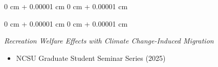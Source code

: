 \documentclass[12pt]{article}
\newenvironment{highlights}{
	\begin{itemize}[
		topsep=0.10 cm,
		parsep=0.10 cm,
		partopsep=0pt,
		itemsep=0pt,
		leftmargin=0.3 cm + 10pt,
		label={}
		]
	}{
	\end{itemize}
} %
\newenvironment{onecolentry}{
	\begin{adjustwidth}{
			0 cm + 0.00001 cm
		}{
			0 cm + 0.00001 cm
		}
	}
	{
	\end{adjustwidth}
} %
\newenvironment{paper}{
	\begin{onecolentry}
	\begin{hangingpar}
}{
	\end{hangingpar}
	\end{onecolentry}
	\smallskip
} %
\newenvironment{twocolentry}[2][]{
	\onecolentry
	\def\secondColumn{#2}
	\setcolumnwidth{\fill, 4.5 cm}
	\begin{paracol}{2}
	}{
		\switchcolumn \raggedleft \secondColumn
	\end{paracol}
	\endonecolentry
} %
\newcommand{\Star}[1]{#1\ensuremath{^*}\kern-\scriptspace}
\begin{document}
\begin{paper}
\vspace{0.1cm}

\begin{onecolentry}
	\emph{Recreation Welfare Effects with Climate Change-Induced Migration}
	\begin{highlights}
		\item \small NCSU Graduate Student Seminar Series (2025)
	\end{highlights}
\end{onecolentry}










\end{paper}
\end{document}
